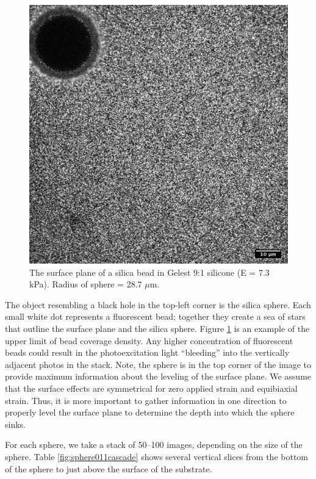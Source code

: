\begin{figure}[h!]
	\centering
	\includegraphics[width=.75\linewidth]{Chapters/Figures/190215_g91_glass_sphere011_surface.png}
	\caption[The surface plane of a silica bead in silcone]{The surface plane of a silica bead in Gelest 9:1 silicone (E = 7.3 kPa). Radius of sphere = 28.7 $\mu$m.}
	\label{fig:190215g91glasssphere011surface}
\end{figure}
The object resembling a black hole in the top-left corner is the silica sphere. Each small white dot represents a fluorescent bead; together they create a sea of stars that outline the surface plane and the silica sphere. Figure \ref{fig:190215g91glasssphere011surface} is an example of the upper limit of bead coverage density. Any higher concentration of fluorescent beads could result in the photoexcitation light ``bleeding'' into the vertically adjacent photos in the stack. Note, the sphere is in the top corner of the image to provide maximum information about the leveling of the surface plane. We assume that the surface effects are symmetrical for zero applied strain and equibiaxial strain. Thus, it is more important to gather information in one direction to properly level the surface plane to determine the depth into which the sphere sinks. 

For each sphere, we take a stack of 50--100 images, depending on the size of the sphere. Table \ref{fig:sphere011cascade} shows several vertical slices from the bottom of the sphere to just above the surface of the substrate.


